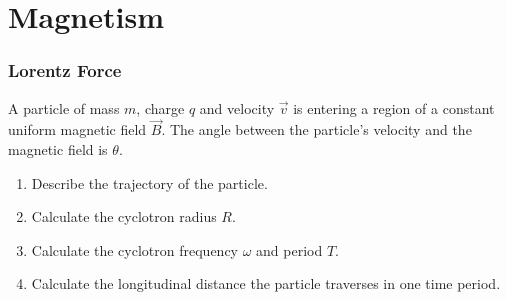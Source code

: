 \documentclass[fleqn, a4paper, 12pt, twoside]{article}
\theoremstyle{definition}
\theoremstyle{theorem}
\begin{document}
\addtocounter{question}{1}

\newpage
\part{Magnetism}

\section{Lorentz Force}

\begin{question}
	A particle of mass $m$, charge $q$ and velocity $\overrightarrow{v}$ is entering a region of a constant uniform magnetic field $\overrightarrow{B}$.
	The angle between the particle's velocity and the magnetic field is $\theta$.	
	\begin{enumerate}
		\item Describe the trajectory of the particle.
		\item Calculate the cyclotron radius $R$.
		\item Calculate the cyclotron frequency $\omega$ and period $T$.
		\item Calculate the longitudinal distance the particle traverses in one time period.
	\end{enumerate}
\end{question}
\end{document}
